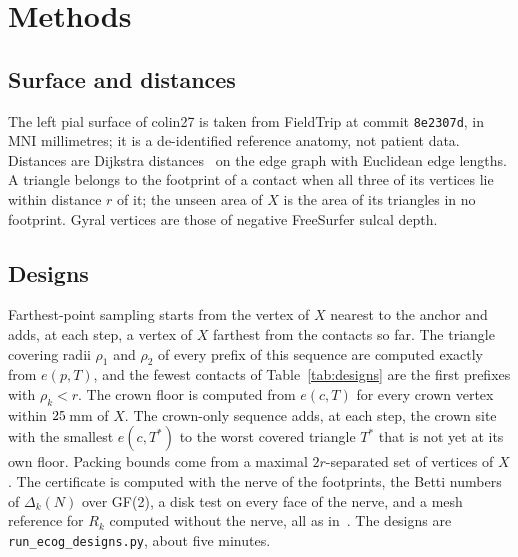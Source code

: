 \documentclass[11pt]{amsart}
\theoremstyle{definition}
\theoremstyle{remark}
\begin{document}
\section{Methods}\label{sec:methods}

\subsection*{Surface and distances}
The left pial surface of colin27 is taken from FieldTrip at commit
\texttt{8e2307d}, in MNI millimetres; it is a de-identified reference anatomy,
not patient data. Distances are Dijkstra distances~\cite{Dijkstra1959} on the
edge graph with Euclidean edge lengths. A triangle belongs to the footprint of
a contact when all three of its vertices lie within distance $r$ of it; the
unseen area of $X$ is the area of its triangles in no footprint. Gyral
vertices are those of negative FreeSurfer sulcal depth.

\subsection*{Designs}
Farthest-point sampling starts from the vertex of $X$ nearest to the anchor and
adds, at each step, a vertex of $X$ farthest from the contacts so far. The
triangle covering radii $\rho_1$ and $\rho_2$ of every prefix of this sequence
are computed exactly from $e(p,T)$, and the fewest contacts of
Table~\ref{tab:designs} are the first prefixes with $\rho_k<r$. The crown floor
is computed from $e(c,T)$ for every crown vertex within $25$\,mm of
$X$. The crown-only sequence adds, at each step, the crown site with the
smallest $e(c,T^\ast)$ to the worst covered triangle $T^\ast$ that is not yet
at its own floor. Packing bounds come from a maximal $2r$-separated set of
vertices of $X$. The certificate is computed with the nerve of the footprints,
the Betti numbers of $\Delta_k(N)$ over GF(2), a disk test on every face of the
nerve, and a mesh reference for $R_k$ computed without the nerve, all as
in~\cite{kshadowcode}. The designs are \texttt{run\_ecog\_designs.py}, about
five minutes.
\end{document}

